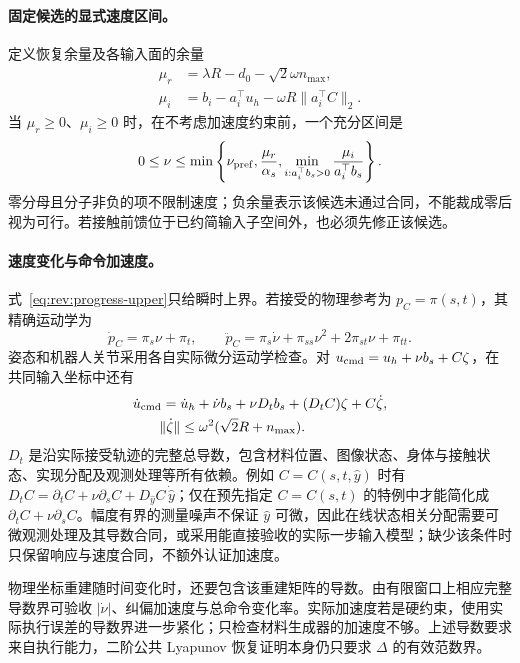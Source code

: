 \documentclass[11pt,a4paper]{article}
\numberwithin{equation}{section}
\theoremstyle{definition}
\begin{document}
\paragraph{固定候选的显式速度区间。}
定义恢复余量及各输入面的余量
\begin{align}
 \mu_r&=\lambda R-d_0-\sqrt2\omega n_{\max},\\
 \mu_i&=b_i-a_i^\top u_h-\omega R\|a_i^\top C\|_2
.
 \label{eq:rev:progress-margins}
\end{align}
当 $\mu_r\ge0$、$\mu_i\ge0$ 时，在不考虑加速度约束前，一个充分区间是
\begin{equation}
 0\le\nu\le
 \min\left\{\nu_{\rm pref},
 \frac{\mu_r}{\alpha_s},
 \min_{i:a_i^\top b_s>0}\frac{\mu_i}{a_i^\top b_s}\right\}.
 \label{eq:rev:progress-upper}
\end{equation}
零分母且分子非负的项不限制速度；负余量表示该候选未通过合同，不能裁成零后视为可行。若接触前馈位于已约简输入子空间外，也必须先修正该候选。

\paragraph{速度变化与命令加速度。}
式~\eqref{eq:rev:progress-upper}只给瞬时上界。若接受的物理参考为 $p_C=\pi(s,t)$，其精确运动学为
\begin{equation}
 \dot p_C=\pi_s\nu+\pi_t,\qquad
 \ddot p_C=\pi_s\dot\nu+\pi_{ss}\nu^2+2\pi_{st}\nu+\pi_{tt}.
 \label{eq:rev:physical-progress-acceleration}
\end{equation}
姿态和机器人关节采用各自实际微分运动学检查。对 $u_{\rm cmd}=u_h+\nu b_s+C\zeta$，在共同输入坐标中还有
\begin{align}
 \dot u_{\rm cmd}
 ={}&\dot u_h+\dot\nu b_s+\nu D_t b_s+(D_t C)\zeta+C\dot\zeta,\\
 \|\dot\zeta\|&\le\omega^2(\sqrt2R+n_{\max}).
 \label{eq:rev:command-acceleration}
\end{align}
$D_t$ 是沿实际接受轨迹的完整总导数，包含材料位置、图像状态、身体与接触状态、实现分配及观测处理等所有依赖。例如 $C=C(s,t,\widehat y)$ 时有 $D_tC=\partial_tC+\nu\partial_sC+D_{\widehat y}C\,\dot{\widehat y}$；仅在预先指定 $C=C(s,t)$ 的特例中才能简化成 $\partial_tC+\nu\partial_sC$。幅度有界的测量噪声不保证 $\widehat y$ 可微，因此在线状态相关分配需要可微观测处理及其导数合同，或采用能直接验收的实际一步输入模型；缺少该条件时只保留响应与速度合同，不额外认证加速度。

物理坐标重建随时间变化时，还要包含该重建矩阵的导数。由有限窗口上相应完整导数界可验收 $|\dot\nu|$、纠偏加速度与总命令变化率。实际加速度若是硬约束，使用实际执行误差的导数界进一步紧化；只检查材料生成器的加速度不够。上述导数要求来自执行能力，二阶公共 Lyapunov 恢复证明本身仍只要求 $\Delta$ 的有效范数界。
\end{document}
